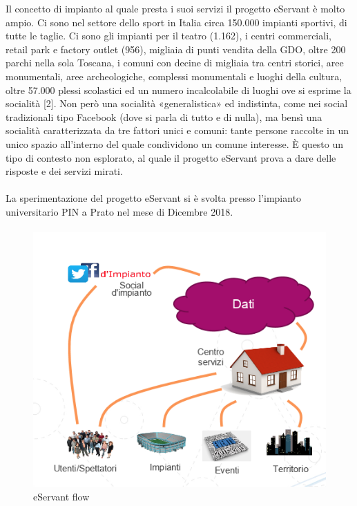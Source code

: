 Il concetto di impianto al quale presta i suoi servizi il progetto eServant è molto ampio.
Ci sono nel settore dello sport in Italia circa 150.000 impianti sportivi, di tutte le taglie. Ci sono gli impianti per il teatro (1.162), i centri commerciali, retail park e factory outlet (956), migliaia di punti vendita della GDO, oltre 200 parchi nella sola Toscana, i comuni con decine di migliaia tra centri storici, aree monumentali, aree archeologiche, complessi monumentali e luoghi della cultura, oltre 57.000 plessi scolastici ed un numero incalcolabile di luoghi ove si esprime la socialità [2].
Non però una socialità «generalistica» ed indistinta, come nei social tradizionali tipo Facebook (dove si parla di tutto e di nulla), ma bensì una socialità caratterizzata da tre fattori unici e comuni:
tante persone
raccolte in un unico spazio
all’interno del quale condividono un comune interesse.
È questo un tipo di contesto non esplorato, al quale il progetto eServant prova a dare delle risposte e dei servizi mirati.
\paragraph{}

La sperimentazione del progetto eServant si è svolta presso l’impianto universitario PIN a Prato nel mese di Dicembre 2018.
\paragraph{}

\begin{figure}[h!]
    \centering  
    \caption{eServant flow}
    \includegraphics[scale=0.8]{img/cap1/eservant}
\end{figure}

